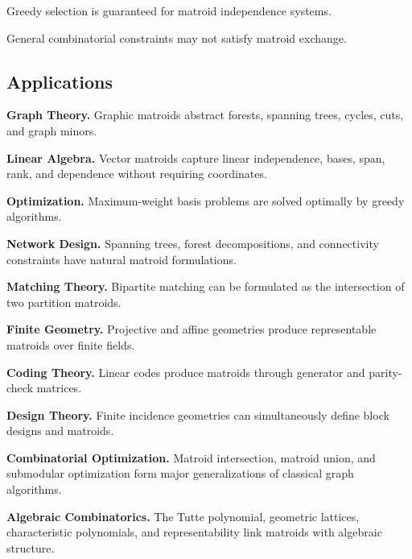 Greedy selection is guaranteed for matroid independence systems.

General combinatorial constraints may not satisfy matroid exchange.

\subsection{Applications}
\label{subsec:matroid-applications}

\begin{applicationbox}

\textbf{Graph Theory.}
Graphic matroids abstract forests, spanning trees, cycles, cuts, and
graph minors.

\medskip

\textbf{Linear Algebra.}
Vector matroids capture linear independence, bases, span, rank, and
dependence without requiring coordinates.

\medskip

\textbf{Optimization.}
Maximum-weight basis problems are solved optimally by greedy algorithms.

\medskip

\textbf{Network Design.}
Spanning trees, forest decompositions, and connectivity constraints
have natural matroid formulations.

\medskip

\textbf{Matching Theory.}
Bipartite matching can be formulated as the intersection of two
partition matroids.

\medskip

\textbf{Finite Geometry.}
Projective and affine geometries produce representable matroids over
finite fields.

\medskip

\textbf{Coding Theory.}
Linear codes produce matroids through generator and parity-check
matrices.

\medskip

\textbf{Design Theory.}
Finite incidence geometries can simultaneously define block designs
and matroids.

\medskip

\textbf{Combinatorial Optimization.}
Matroid intersection, matroid union, and submodular optimization form
major generalizations of classical graph algorithms.

\medskip

\textbf{Algebraic Combinatorics.}
The Tutte polynomial, geometric lattices, characteristic polynomials,
and representability link matroids with algebraic structure.

\end{applicationbox}

